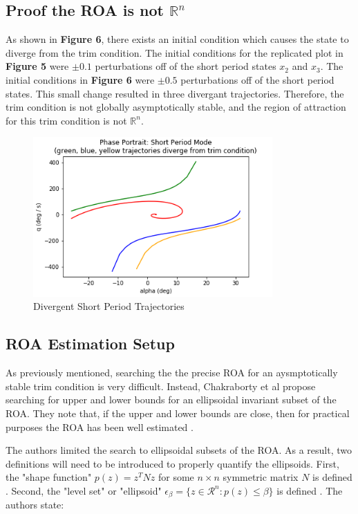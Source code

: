 \documentclass[%
 reprint,
 amsmath,amssymb,
 aps,
]{revtex4-2}
\begin{document}
\subsection{Proof the ROA is not $\mathbb{R}^n$}

As shown in \textbf{Figure 6}, there exists an initial condition which causes the state to diverge from the trim condition. The initial conditions for the replicated plot in \textbf{Figure 5} were $\pm0.1$ perturbations off of the short period states $x_2$ and $x_3$. The initial conditions in \textbf{Figure 6} were $\pm0.5$ perturbations off of the short period states. This small change resulted in three divergant trajectories. Therefore, the trim condition is not globally asymptotically stable, and the region of attraction for this trim condition is not $\mathbb{R}^n$.

\begin{figure}
    \centering
    \includegraphics[width=3.6in]{fig3_redo_divergent.png}
    \caption{Divergent Short Period Trajectories}
    \label{fig:my_label}
\end{figure}

\subsection{ROA Estimation Setup}

As previously mentioned, searching the the precise ROA for an aysmptotically stable trim condition is very difficult. Instead, Chakraborty et al propose searching for upper and lower bounds for an ellipsoidal invariant subset of the ROA. They note that, if the upper and lower bounds are close, then for practical purposes the ROA has been well estimated \cite{primary}. 

The authors limited the search to ellipsoidal subsets of the ROA. As a result, two definitions will need to be introduced to properly quantify the ellipsoids. First, the "shape function" $p(z) = z^T N z$ for some $n \times n$ symmetric matrix $N$ is defined \cite{primary}. Second, the "level set" or "ellipsoid" $\epsilon_\beta = \{ z \in \mathcal{R}^n : p(z) \leq \beta \}$ is defined \cite{primary}. The authors state: 
\end{document}
